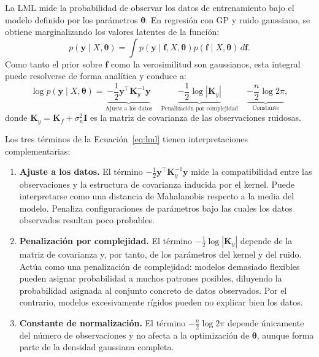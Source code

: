 La LML mide la probabilidad de observar los datos de entrenamiento
bajo el modelo definido por los parámetros \(\bm{\theta}\). En regresión con GP y ruido
gaussiano, se obtiene marginalizando los valores latentes de la función:
\[
p(\bm{y}\mid X,\bm{\theta})
=
\int p(\bm{y}\mid \bm{f},X,\bm{\theta})p(\bm{f}\mid X,\bm{\theta})\,d\bm{f}.
\]
Como tanto el prior sobre \(\bm{f}\) como la verosimilitud son gaussianos, esta integral puede
resolverse de forma analítica y conduce a:
\begin{equation}
\log p(\bm{y}\mid X,\bm{\theta})
=
\underbrace{-\frac{1}{2}\bm{y}^\top \bm{K}_y^{-1}\bm{y}}_{\text{Ajuste a los datos}}
\quad
\underbrace{-\frac{1}{2}\log|\bm{K}_y|}_{\text{Penalización por complejidad}}
\quad
\underbrace{-\frac{n}{2}\log 2\pi}_{\text{Constante}},
\label{eq:lml}
\end{equation}
donde
\(
\bm{K}_y=\bm{K}_f+\sigma_n^2\bm{I}
\)
es la matriz de covarianza de las observaciones ruidosas.

Los tres términos de la Ecuación~\ref{eq:lml} tienen interpretaciones complementarias:

\begin{enumerate}
    \item \textbf{Ajuste a los datos.}
    El término
    \(
    -\frac{1}{2}\bm{y}^\top \bm{K}_y^{-1}\bm{y}
    \)
    mide la compatibilidad entre las observaciones y la estructura de covarianza inducida
    por el kernel. Puede interpretarse como una distancia de Mahalanobis respecto a la media
    del modelo. Penaliza configuraciones de parámetros bajo las cuales los datos
    observados resultan poco probables.

    \item \textbf{Penalización por complejidad.}
    El término
    \(
    -\frac{1}{2}\log|\bm{K}_y|
    \)
    depende de la matriz de covarianza y, por tanto, de los parámetros del kernel y del
    ruido. Actúa como una penalización de complejidad: modelos demasiado flexibles pueden
    asignar probabilidad a muchos patrones posibles, diluyendo la probabilidad asignada al
    conjunto concreto de datos observados. Por el contrario, modelos excesivamente rígidos
    pueden no explicar bien los datos.

    \item \textbf{Constante de normalización.}
    El término
    \(
    -\frac{n}{2}\log 2\pi
    \)
    depende únicamente del número de observaciones y no afecta a la optimización de
    \(\bm{\theta}\), aunque forma parte de la densidad gaussiana completa.
\end{enumerate}


